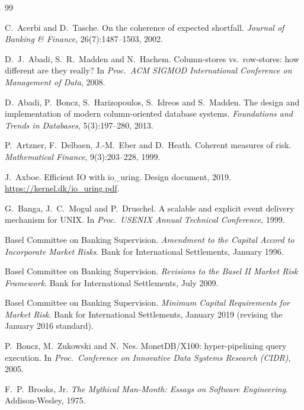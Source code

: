\begingroup
\renewcommand{\bibname}{Bibliography}
\small
\begin{thebibliography}{99}
\setlength{\itemsep}{3pt}

 C.~Acerbi and D.~Tasche. On the coherence of expected shortfall. \emph{Journal of Banking \& Finance}, 26(7):1487--1503, 2002.

 D.~J.~Abadi, S.~R.~Madden and N.~Hachem. Column-stores vs.\ row-stores: how different are they really? In \emph{Proc.\ ACM SIGMOD International Conference on Management of Data}, 2008.

 D.~Abadi, P.~Boncz, S.~Harizopoulos, S.~Idreos and S.~Madden. The design and implementation of modern column-oriented database systems. \emph{Foundations and Trends in Databases}, 5(3):197--280, 2013.

 P.~Artzner, F.~Delbaen, J.-M.~Eber and D.~Heath. Coherent measures of risk. \emph{Mathematical Finance}, 9(3):203--228, 1999.

 J.~Axboe. Efficient IO with io\_uring. Design document, 2019. \url{https://kernel.dk/io_uring.pdf}.

 G.~Banga, J.~C.~Mogul and P.~Druschel. A scalable and explicit event delivery mechanism for UNIX. In \emph{Proc.\ USENIX Annual Technical Conference}, 1999.

 Basel Committee on Banking Supervision. \emph{Amendment to the Capital Accord to Incorporate Market Risks}. Bank for International Settlements, January 1996.

 Basel Committee on Banking Supervision. \emph{Revisions to the Basel II Market Risk Framework}. Bank for International Settlements, July 2009.

 Basel Committee on Banking Supervision. \emph{Minimum Capital Requirements for Market Risk}. Bank for International Settlements, January 2019 (revising the January 2016 standard).

 P.~Boncz, M.~Zukowski and N.~Nes. MonetDB/X100: hyper-pipelining query execution. In \emph{Proc.\ Conference on Innovative Data Systems Research (CIDR)}, 2005.

 F.~P.~Brooks, Jr. \emph{The Mythical Man-Month: Essays on Software Engineering}. Addison-Wesley, 1975.


\end{thebibliography}
